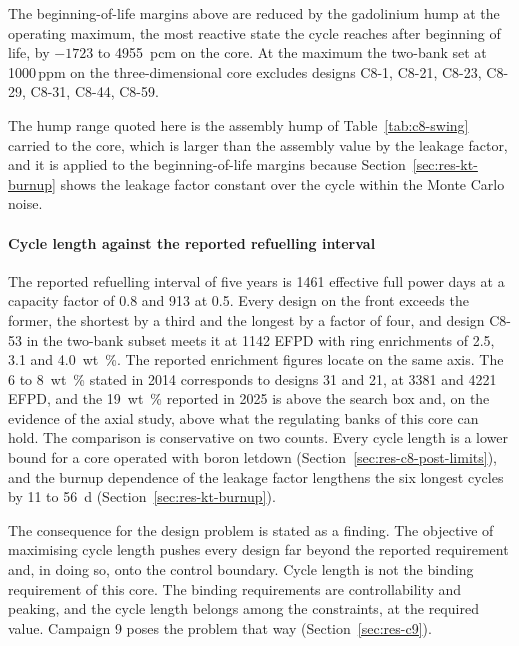The beginning-of-life margins above are reduced by the gadolinium hump
at the operating maximum, the most reactive state the cycle reaches
after beginning of life, by $-1723$ to \SI{+4955}{pcm} on the core. At the maximum the two-bank set at 1000\,ppm on the three-dimensional core excludes designs C8-1, C8-21, C8-23, C8-29, C8-31, C8-44, C8-59.

The hump range quoted here is the assembly hump of
Table~\ref{tab:c8-swing} carried to the core, which is larger than the
assembly value by the leakage factor, and it is applied to the
beginning-of-life margins because
Section~\ref{sec:res-kt-burnup} shows the leakage factor constant over
the cycle within the Monte Carlo noise.



\paragraph{Cycle length against the reported refuelling interval}
\label{sec:res-c8-mission}

The reported refuelling interval of five years is 1461 effective full
power days at a capacity factor of 0.8 and 913 at 0.5. Every design on the front exceeds the former, the shortest by
a third and the longest by a factor of four, and design C8-53 in the
two-bank subset meets it at 1142 EFPD with ring enrichments of 2.5,
3.1 and \SI{4.0}{wt\%}. The reported enrichment figures locate on the
same axis. The 6 to \SI{8}{wt\%} stated in 2014 corresponds to designs
31 and 21, at 3381 and 4221 EFPD, and the \SI{19}{wt\%} reported in
2025 is above the search box and, on the evidence of the axial study,
above what the regulating banks of this core can hold. The comparison
is conservative on two counts. Every cycle length is a lower bound
for a core operated with boron letdown
(Section~\ref{sec:res-c8-post-limits}), and the burnup dependence of
the leakage factor lengthens the six longest cycles by 11 to
\SI{56}{d} (Section~\ref{sec:res-kt-burnup}).

The consequence for the design problem is stated as a finding. The
objective of maximising cycle length pushes every design far beyond
the reported requirement and, in doing so, onto the control boundary.
Cycle length is not the binding requirement of this core. The binding
requirements are controllability and peaking, and the cycle length
belongs among the constraints, at the required value. Campaign 9 poses
the problem that way (Section~\ref{sec:res-c9}).

